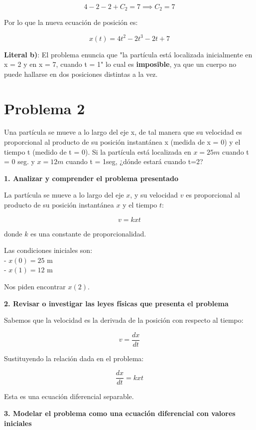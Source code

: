 \documentclass[answers]{exam}
\begin{document}
\[
	4 - 2 - 2 + C_2 = 7 \implies C_2 = 7
\]

Por lo que la nueva ecuación de posición es:

\[
	x(t) = 4t^2 - 2t^3 - 2t + 7
\]

\textbf{Literal b)}: El problema enuncia que "la partícula está localizada inicialmente en x = 2 y en x = 7, cuando t = 1" lo cual es \textbf{imposible}, ya que un cuerpo no puede hallarse en dos posiciones distintas a la vez.

\section*{Problema 2}

Una partícula se mueve a lo largo del eje x, de tal manera que su velocidad es proporcional
al producto de su posición instantánea x (medida de x = 0) y el tiempo t (medido de t = 0). Si
la partícula está localizada en $x = 25 m$ cuando t = 0 seg. y $x = 12 m$ cuando t = 1seg, ¿dónde
estará cuando t=2?


\vspace{1em}
\textbf{1. Analizar y comprender el problema presentado}

La partícula se mueve a lo largo del eje \( x \), y su velocidad \( v \) es proporcional al producto de su posición instantánea \( x \) y el tiempo \( t \):

\[
	v = k x t
\]

donde \( k \) es una constante de proporcionalidad.

Las condiciones iniciales son:\\
- \( x(0) = 25 \) m\\
- \( x(1) = 12 \) m

Nos piden encontrar \( x(2) \).

\newpage

\textbf{2. Revisar o investigar las leyes físicas que presenta el problema}

Sabemos que la velocidad es la derivada de la posición con respecto al tiempo:

\[
	v = \frac{dx}{dt}
\]

Sustituyendo la relación dada en el problema:

\[
	\frac{dx}{dt} = k x t
\]

Esta es una ecuación diferencial separable.

\vspace{0.3cm}
\textbf{3. Modelar el problema como una ecuación diferencial con valores iniciales}
\end{document}
